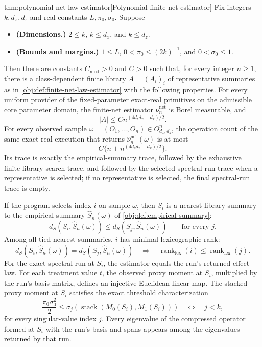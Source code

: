 \documentclass[11pt]{article}
\begin{document}
\begin{theoremv}{thm:polynomial-net-law-estimator}[Polynomial finite-net estimator]
Fix integers \(k,d_x,d_z\) and real constants \(L,\pi_0,\sigma_0\). Suppose
\begin{itemize}
\item \textbf{(Dimensions.)} \(2\le k\), \(k\le d_x\), and \(k\le d_z\).
\item \textbf{(Bounds and margins.)} \(1\le L\), \(0<\pi_0\le (2k)^{-1}\), and \(0<\sigma_0\le 1\).
\end{itemize}
Then there are constants \(C_{\mathrm{mod}}>0\) and \(C>0\) such that, for every integer \(n\ge 1\), there is a class-dependent finite library \(A=(A_i)_i\) of representative summaries as in \cref{obj:def:finite-net-law-estimator} with the following properties. For every uniform provider of the fixed-parameter exact-real primitives on the admissible core parameter domain, the finite-net estimator \(\widehat\nu_n^{\mathrm{net}}\) is Borel measurable, and
\[
|A|\le C n^{(4d_zd_x+d_x)/2}.
\]
For every observed sample \(\omega=(O_1,\ldots,O_n)\in O_{d_x,d_z}^n\), the operation count of the same exact-real execution that returns \(\widehat\nu_n^{\mathrm{net}}(\omega)\) is at most
\[
C\{n+n^{(4d_zd_x+d_x)/2}\}.
\]
Its trace is exactly the empirical-summary trace, followed by the exhaustive finite-library search trace, and followed by the selected spectral-run trace when a representative is selected; if no representative is selected, the final spectral-run trace is empty.

If the program selects index \(i\) on sample \(\omega\), then \(S_i\) is a nearest library summary to the empirical summary \(\widehat S_n(\omega)\) of \cref{obj:def:empirical-summary}:
\[
d_S(S_i,\widehat S_n(\omega))\le d_S(S_j,\widehat S_n(\omega))
\qquad\text{for every }j.
\]
Among all tied nearest summaries, \(i\) has minimal lexicographic rank:
\[
d_S(S_i,\widehat S_n(\omega))=d_S(S_j,\widehat S_n(\omega))
\quad\Longrightarrow\quad
\operatorname{rank}_{\mathrm{lex}}(i)\le \operatorname{rank}_{\mathrm{lex}}(j).
\]
For the exact spectral run at \(S_i\), the estimator equals the run's returned effect law. For each treatment value \(t\), the observed proxy moment at \(S_i\), multiplied by the run's basis matrix, defines an injective Euclidean linear map. The stacked proxy moment at \(S_i\) satisfies the exact threshold characterization
\[
\frac{\pi_0\sigma_0^2}{2}\le \sigma_j(\operatorname{stack}(M_0(S_i),M_1(S_i)))
\quad\Longleftrightarrow\quad
j<k,
\]
for every singular-value index \(j\). Every eigenvalue of the compressed operator formed at \(S_i\) with the run's basis and spans appears among the eigenvalues returned by that run.


\end{theoremv}
\end{document}
